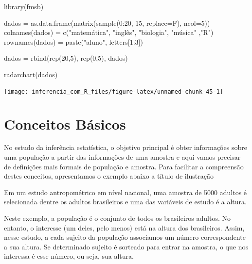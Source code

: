 \documentclass[
]{book}
\newenvironment{Shaded}{\begin{snugshade}}{\end{snugshade}}
\newcommand{\AttributeTok}[1]{\textcolor[rgb]{0.77,0.63,0.00}{#1}}
\newcommand{\DecValTok}[1]{\textcolor[rgb]{0.00,0.00,0.81}{#1}}
\newcommand{\FunctionTok}[1]{\textcolor[rgb]{0.00,0.00,0.00}{#1}}
\newcommand{\NormalTok}[1]{#1}
\newcommand{\OtherTok}[1]{\textcolor[rgb]{0.56,0.35,0.01}{#1}}
\newcommand{\SpecialCharTok}[1]{\textcolor[rgb]{0.00,0.00,0.00}{#1}}
\newcommand{\StringTok}[1]{\textcolor[rgb]{0.31,0.60,0.02}{#1}}
\begin{document}
\begin{Shaded}
\begin{Highlighting}[]
\FunctionTok{library}\NormalTok{(fmsb)}

\NormalTok{dados }\OtherTok{=} \FunctionTok{as.data.frame}\NormalTok{(}\FunctionTok{matrix}\NormalTok{(}\FunctionTok{sample}\NormalTok{(}\DecValTok{0}\SpecialCharTok{:}\DecValTok{20}\NormalTok{, }\DecValTok{15}\NormalTok{, }\AttributeTok{replace=}\NormalTok{F), }\AttributeTok{ncol=}\DecValTok{5}\NormalTok{))}
\FunctionTok{colnames}\NormalTok{(dados) }\OtherTok{=} \FunctionTok{c}\NormalTok{(}\StringTok{"matemática"}\NormalTok{, }\StringTok{"inglês"}\NormalTok{, }\StringTok{"biologia"}\NormalTok{, }\StringTok{"música"}\NormalTok{ ,}\StringTok{"R"}\NormalTok{)}
\FunctionTok{rownames}\NormalTok{(dados) }\OtherTok{=} \FunctionTok{paste}\NormalTok{(}\StringTok{"aluno"}\NormalTok{, letters[}\DecValTok{1}\SpecialCharTok{:}\DecValTok{3}\NormalTok{])}

\NormalTok{dados }\OtherTok{=} \FunctionTok{rbind}\NormalTok{(}\FunctionTok{rep}\NormalTok{(}\DecValTok{20}\NormalTok{,}\DecValTok{5}\NormalTok{), }\FunctionTok{rep}\NormalTok{(}\DecValTok{0}\NormalTok{,}\DecValTok{5}\NormalTok{), dados)}
 
\FunctionTok{radarchart}\NormalTok{(dados)}
\end{Highlighting}
\end{Shaded}

\begin{center}\texttt{[image: inferencia\_com\_R\_files/figure-latex/unnamed-chunk-45-1]} \end{center}

\hypertarget{conceitos-buxe1sicos}{%
\chapter{Conceitos Básicos}\label{conceitos-buxe1sicos}}

No estudo da inferência estatística, o objetivo principal é obter informações sobre uma população a partir das informações de uma amostra e aqui vamos precisar de definições mais formais de população e amostra. Para facilitar a compreensão destes conceitos, apresentamos o exemplo abaixo a título de ilustração

Em um estudo antropométrico em nível nacional, uma amostra de 5000 adultos é selecionada dentre os adultos brasileiros e uma das variáveis de estudo é a altura.

Neste exemplo, a população é o conjunto de todos os brasileiros adultos. No entanto, o interesse (um deles, pelo menos) está na altura dos brasileiros. Assim, nesse estudo, a cada sujeito da população associamos um número correspondente a sua altura. Se determinado sujeito é sorteado para entrar na amostra, o que nos interessa é esse número, ou seja, sua altura.
\end{document}

